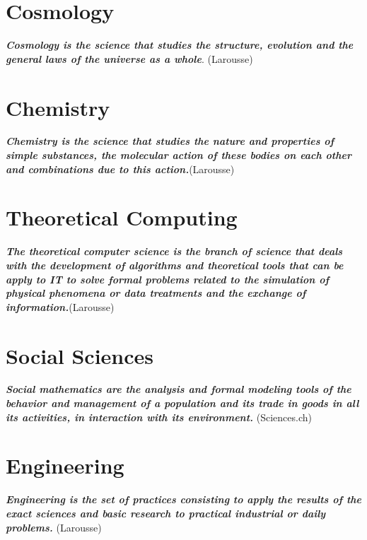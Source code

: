 \documentclass[12pt,a4paper,twoside,openright]{report}
\theoremstyle{definition}
\theoremstyle{itexmp}
\numberwithin{equation}{section}
\begin{document}
\chapter{Cosmology}

	\textit{\textbf{Cosmology is the science that studies the structure, evolution and the general laws of the universe as a whole}}. (Larousse)
	\minitoc
	\pagebreak
	

	
\chapter{Chemistry}

	\textit{\textbf{Chemistry is the science that studies the nature and properties of simple substances, the molecular action of these bodies on each other and combinations due to this action.}}(Larousse)
	\minitoc
	\pagebreak 
	
	
	
\chapter{Theoretical Computing}
	\label{theoretical computing}
	\textit{\textbf{The theoretical computer science is the branch of science that deals with the development of algorithms and theoretical tools that can be apply to IT to solve formal problems related to the simulation of physical phenomena or data treatments and the exchange of information.}}(Larousse)
	\minitoc
	\pagebreak 
	
	
	
\chapter{Social Sciences}

	\textit{\textbf{Social mathematics are the analysis and formal modeling tools of the behavior and management of a population and its trade in goods in all its activities, in interaction with its environment.}} (Sciences.ch)
	\minitoc
	\pagebreak
	
	
		
\chapter{Engineering}

	\textit{\textbf{Engineering is the set of practices consisting to apply the results of the exact sciences and basic research to practical industrial or daily problems.}} (Larousse)
	\minitoc
	\pagebreak
	
\end{document}
